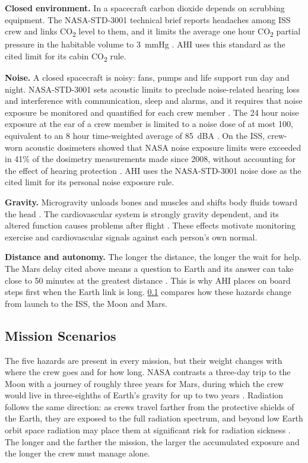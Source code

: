 \medskip\noindent\textbf{Closed environment.} In a spacecraft carbon dioxide depends on scrubbing equipment. The NASA-STD-3001 technical brief reports headaches among ISS crew and links CO\textsubscript{2} level to them, and it limits the average one hour CO\textsubscript{2} partial pressure in the habitable volume to 3~mmHg \cite{nasa_ochmo_tb004_co2}. AHI uses this standard as the cited limit for its cabin CO\textsubscript{2} rule.

\medskip\noindent\textbf{Noise.} A closed spacecraft is noisy: fans, pumps and life support run day and night. NASA-STD-3001 sets acoustic limits to preclude noise-related hearing loss and interference with communication, sleep and alarms, and it requires that noise exposure be monitored and quantified for each crew member \cite{nasa_ochmo_tb035_acoustics}. The 24 hour noise exposure at the ear of a crew member is limited to a noise dose of at most 100, equivalent to an 8 hour time-weighted average of 85~dBA \cite{nasa_ochmo_tb035_acoustics}. On the ISS, crew-worn acoustic dosimeters showed that NASA noise exposure limits were exceeded in 41\% of the dosimetry measurements made since 2008, without accounting for the effect of hearing protection \cite{limardo2021noise}. AHI uses the NASA-STD-3001 noise dose as the cited limit for its personal noise exposure rule.

\medskip\noindent\textbf{Gravity.} Microgravity unloads bones and muscles and shifts body fluids toward the head \cite{nasa_hrp_gravity_fields}. The cardiovascular system is strongly gravity dependent, and its altered function causes problems after flight \cite{hughson2018heart}. These effects motivate monitoring exercise and cardiovascular signals against each person's own normal.

\medskip\noindent\textbf{Distance and autonomy.} The longer the distance, the longer the wait for help. The Mars delay cited above means a question to Earth and its answer can take close to 50 minutes at the greatest distance \cite{nasa_space_communications_seven_things}. This is why AHI places on board steps first when the Earth link is long. \ref{subsec:mission-scenarios} compares how these hazards change from launch to the ISS, the Moon and Mars.

\subsection{Mission Scenarios}
\label{subsec:mission-scenarios}

The five hazards are present in every mission, but their weight changes with where the crew goes and for how long. NASA contrasts a three-day trip to the Moon with a journey of roughly three years for Mars, during which the crew would live in three-eighths of Earth's gravity for up to two years \cite{nasa_hrp_five_hazards}. Radiation follows the same direction: as crews travel farther from the protective shields of the Earth, they are exposed to the full radiation spectrum, and beyond low Earth orbit space radiation may place them at significant risk for radiation sickness \cite{nasa_why_space_radiation_matters}. The longer and the farther the mission, the larger the accumulated exposure and the longer the crew must manage alone.

